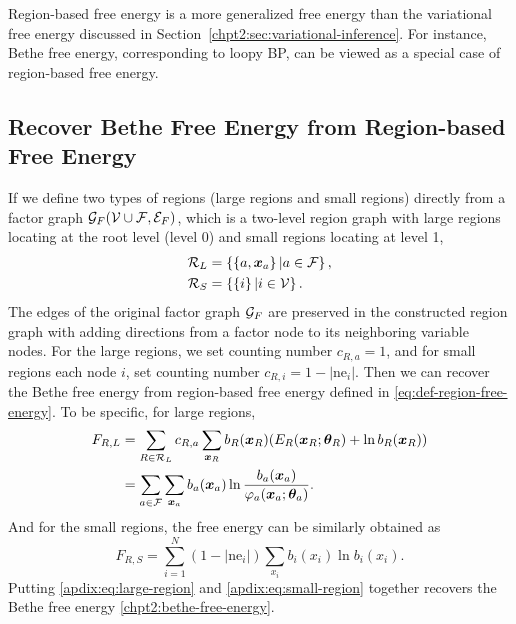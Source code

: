 Region-based free energy is a more generalized free energy than the variational free energy discussed in Section~\ref{chpt2:sec:variational-inference}. For instance, Bethe free energy, corresponding to loopy BP, can be viewed as a special case of region-based free energy.

\subsection{Recover Bethe Free Energy from Region-based Free Energy}
\label{apdix:sec:get-bethe-from-region-energy}
If we define two types of regions (large regions and small
regions) directly from a factor graph $\mathcal{G}_F(\mathcal{V} \cup \mathcal{F}, \mathcal{E}_F)$, which is a two-level region graph with large regions locating at the root level (level 0) and small regions locating at level 1, 
\begin{align}
  \mathcal{R}_{L} &= \left\{ \left\{ a, \bm{x}_a \right\}| a\in \mathcal{F} \right\}, \nonumber \\
  \mathcal{R}_{S} &= \left\{ \left\{ i \right\} | i \in \mathcal{V} \right\}.
\end{align}
The edges of the original factor graph $\mathcal{G}_F$ are preserved in the constructed region graph with adding directions from a factor node to its neighboring variable nodes. For the large regions, we set counting number $c_{R,a}=1$, and for small regions each node $i$, set counting number $c_{R,i}=1-|\mathrm{ne}_i|$. Then we can recover the Bethe free energy from region-based free energy defined in 
\eqref{eq:def-region-free-energy}. To be specific, for
large regions,
\begin{align}\label{apdix:eq:large-region}
  F_{R,L} &=\sum_{R\in \mathcal{R}_{L}} c_{R,a}
            \sum_{\bm{x}_R}b_R(\bm{x}_R) (E_R(\bm{x}_R;\bm{\theta}_R) + \ln{b_R}(\bm{x}_R))
            \nonumber \\
          & =\sum_{a\in \mathcal{F}} \sum_{\bm{x}_a} b_a(\bm{x}_a)\ln{\frac{b_a(\bm{x}_a)}{\varphi_a(\bm{x}_a; \bm{\theta}_a)}}.
\end{align}
And for the small regions, the free energy can be similarly obtained as
\begin{equation}\label{apdix:eq:small-region}
  F_{R,S}  =  \sum_{i=1}^{N} (1- |\mathrm{ne}_i|) \sum_{x_i} b_i(x_i) \ln{b_i(x_i)}.
\end{equation}
Putting \eqref{apdix:eq:large-region} and \eqref{apdix:eq:small-region} together recovers the Bethe free energy \eqref{chpt2:bethe-free-energy}.







